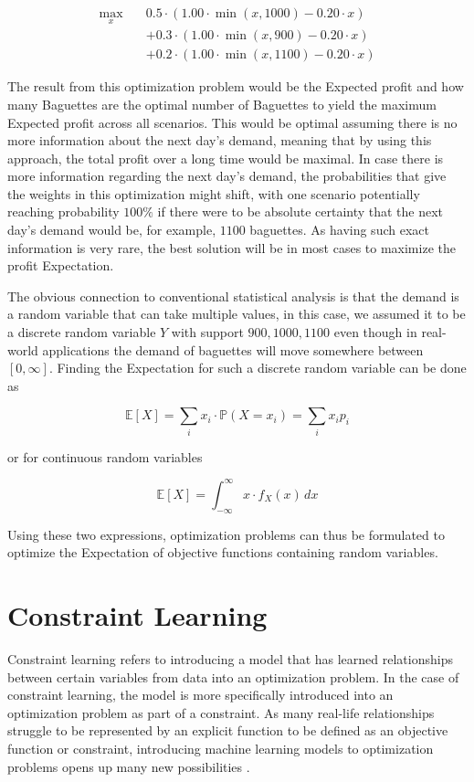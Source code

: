 \begin{align*}
	\max_{x} \quad & 0.5 \cdot \left(1.00 \cdot \min(x,1000) - 0.20 \cdot x \right) \\
	&+ 0.3 \cdot \left(1.00 \cdot \min(x,900) - 0.20 \cdot x\right) \\
	&+ 0.2 \cdot \left(1.00 \cdot \min(x,1100) - 0.20 \cdot x\right)
\end{align*}

The result from this optimization problem would be the Expected profit and how many Baguettes are the optimal number of Baguettes to yield the maximum Expected profit across all scenarios. This would be optimal assuming there is no more information about the next day's demand, meaning that by using this approach, the total profit over a long time would be maximal. In case there is more information regarding the next day's demand, the probabilities that give the weights in this optimization might shift, with one scenario potentially reaching probability $100\%$ if there were to be absolute certainty that the next day's demand would be, for example, $1100$ baguettes. As having such exact information is very rare, the best solution will be in most cases to maximize the profit Expectation. 

The obvious connection to conventional statistical analysis is that the demand is a random variable that can take multiple values, in this case, we assumed it to be a discrete random variable $Y$ with support ${900,1000,1100}$ even though in real-world applications the demand of baguettes will move somewhere between $[0,\infty]$. Finding the Expectation for such a discrete random variable can be done as 

\[
\mathbb{E}[X] = \sum_{i} x_i \cdot \mathbb{P}(X = x_i) = \sum_{i} x_i p_i
\]

or for continuous random variables  
 
\[
\mathbb{E}[X] = \int_{-\infty}^{\infty} x \cdot f_X(x) \, dx
\]

Using these two expressions, optimization problems can thus be formulated to optimize the Expectation of objective functions containing random variables. \cite{BirgeLouveauxStochasticProgramming}


\section{Constraint Learning} \label{sec:constraint_learning}

Constraint learning refers to introducing a model that has learned relationships between certain variables from data into an optimization problem. In the case of constraint learning, the model is more specifically introduced into an optimization problem as part of a constraint. As many real-life relationships struggle to be represented by an explicit function to be defined as an objective function or constraint, introducing machine learning models to optimization problems opens up many new possibilities \cite{FAJEMISIN20241}.

